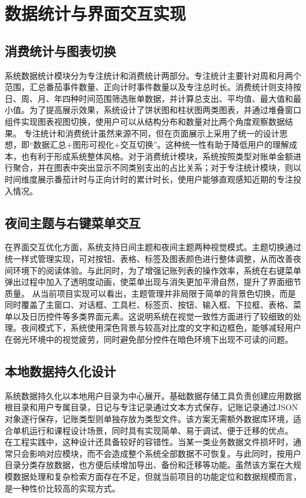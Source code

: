 \section{数据统计与界面交互实现}

\subsection{消费统计与图表切换}
系统数据统计模块分为专注统计和消费统计两部分。专注统计主要针对周和月两个范围，汇总番茄事件数量、正向计时事件数量以及专注总时长。消费统计则支持按日、周、月、年四种时间范围筛选账单数据，并计算总支出、平均值、最大值和最小值。为了提高展示效果，系统设计了饼状图和柱状图两类图表，并通过堆叠窗口组件实现图表视图切换，使用户可以从结构分布和数量对比两个角度观察数据结果。
专注统计和消费统计虽然来源不同，但在页面展示上采用了统一的设计思想，即“数据汇总+图形可视化+交互切换”。这种统一性有助于降低用户的理解成本，也有利于形成系统整体风格。对于消费统计模块，系统按照类型对账单金额进行聚合，并在图表中突出显示不同类别支出的占比关系；对于专注统计模块，则以时间维度展示番茄计时与正向计时的累计时长，使用户能够直观感知近期的专注投入情况。

\subsection{夜间主题与右键菜单交互}
在界面交互优化方面，系统支持日间主题和夜间主题两种视觉模式。主题切换通过统一样式管理实现，可对按钮、表格、标签及图表颜色进行整体调整，从而改善夜间环境下的阅读体验。与此同时，为了增强记账列表的操作效率，系统在右键菜单弹出过程中加入了透明度动画，使菜单出现与消失更加平滑自然，提升了界面细节质量。
从当前项目实现可以看出，主题管理并非局限于简单的背景色切换，而是同时覆盖了主窗口、对话框、工具栏、标签页、按钮、输入框、下拉框、表格、菜单以及日历控件等多类界面元素。这说明系统在视觉一致性方面进行了较细致的处理。夜间模式下，系统使用深色背景与较高对比度的文字和边框色，能够减轻用户在弱光环境中的视觉疲劳，同时避免部分控件在暗色环境下出现不可读的问题。

\subsection{本地数据持久化设计}
系统数据持久化以本地用户目录为中心展开。基础数据存储工具负责创建应用数据根目录和用户专属目录，日记与专注记录通过文本方式保存，记账记录通过JSON对象逐行保存，记账类型则单独存放为类型文件。该方案无需额外数据库环境，适合单机运行和课程设计场景，同时具有实现简单、易于调试、便于迁移的优点。
在工程实践中，这种设计还具备较好的容错性。当某一类业务数据文件损坏时，通常只会影响对应模块，而不会造成整个系统全部数据不可恢复。与此同时，按用户目录分类存放数据，也方便后续增加导出、备份和迁移等功能。虽然该方案在大规模数据处理和复杂检索方面存在不足，但就当前项目的功能定位和数据规模而言，是一种性价比较高的实现方式。